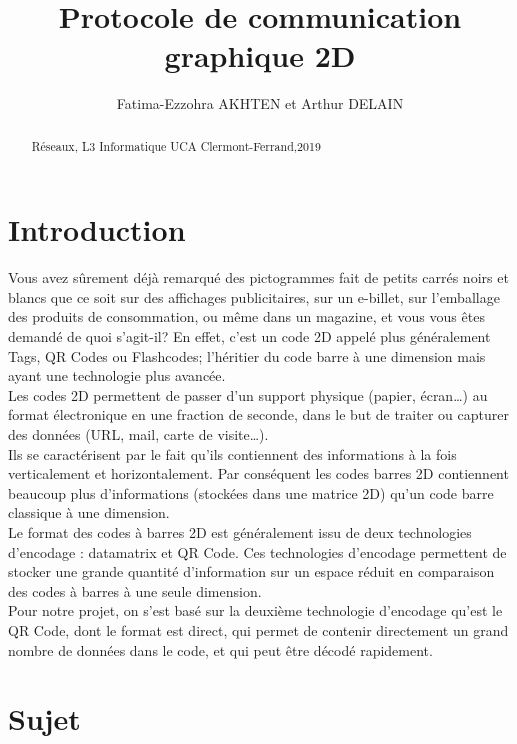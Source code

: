 \documentclass{article}
\begin{document}
\title{Protocole de communication graphique 2D}
\date{}
\author{Fatima-Ezzohra AKHTEN et Arthur DELAIN}
\maketitle
\begin{abstract}
\begin{center}
Réseaux, L3 Informatique UCA Clermont-Ferrand,2019\\
\end{center}
\end{abstract}
\part*{Introduction}
Vous avez sûrement déjà remarqué des pictogrammes fait de petits carrés noirs et blancs que ce soit sur des affichages publicitaires, sur un e-billet, sur l’emballage des produits de consommation, ou même dans un magazine, et vous vous êtes demandé de quoi s’agit-il? En effet, c’est un code 2D appelé plus généralement Tags, QR Codes ou Flashcodes; l'héritier du code barre à une dimension mais ayant une technologie plus avancée.\\

Les codes 2D permettent de passer d'un support physique (papier, écran…) au format électronique en une fraction de seconde, dans le but de traiter ou capturer des données (URL, mail, carte de visite…).\\

Ils se caractérisent par le fait qu'ils contiennent des informations à la fois verticalement et horizontalement. Par conséquent les codes barres 2D contiennent beaucoup plus d'informations (stockées dans une matrice 2D) qu'un code barre classique à une dimension.\\

 
Le format des codes à barres 2D est généralement issu de deux technologies d'encodage : datamatrix et QR Code. Ces technologies d'encodage permettent de stocker une grande quantité d'information sur un espace réduit en comparaison des codes à barres à une seule dimension. \\

Pour notre projet, on s'est basé sur la deuxième technologie d'encodage qu'est le QR Code, dont le format est direct, qui permet de contenir directement un grand nombre de données dans le code, et qui peut être décodé rapidement.


\part*{Sujet}

\end{document}
